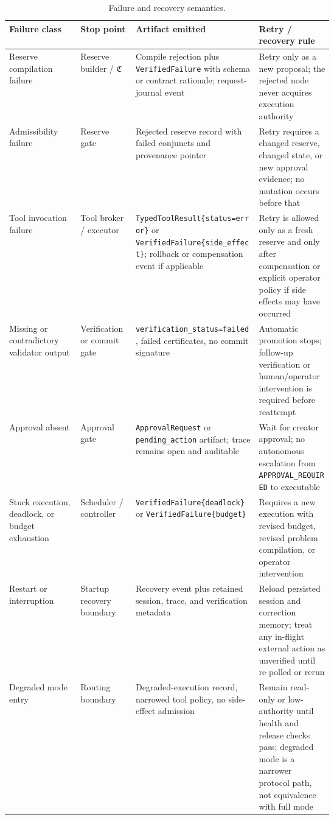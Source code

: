 \documentclass[11pt]{article}
\theoremstyle{remark}
\begin{document}
\begin{table}[H]
\centering
\caption{Failure and recovery semantics.}
\label{tab:failure-recovery}
\footnotesize
\begin{tabularx}{\linewidth}{@{}>{\raggedright\arraybackslash}p{0.22\linewidth}>{\raggedright\arraybackslash}p{0.17\linewidth}X>{\raggedright\arraybackslash}p{0.23\linewidth}@{}}
\toprule
\textbf{Failure class} & \textbf{Stop point} & \textbf{Artifact emitted} & \textbf{Retry / recovery rule} \\
\midrule
Reserve compilation failure & Reserve builder / \(\mathfrak{C}\) & Compile rejection plus \texttt{VerifiedFailure} with schema or contract rationale; request-journal event & Retry only as a new proposal; the rejected node never acquires execution authority \\
\addlinespace
Admissibility failure & Reserve gate & Rejected reserve record with failed conjuncts and provenance pointer & Retry requires a changed reserve, changed state, or new approval evidence; no mutation occurs before that \\
\addlinespace
Tool invocation failure & Tool broker / executor & \texttt{TypedToolResult\{status=error\}} or \texttt{VerifiedFailure\{side\_effect\}}; rollback or compensation event if applicable & Retry is allowed only as a fresh reserve and only after compensation or explicit operator policy if side effects may have occurred \\
\addlinespace
Missing or contradictory validator output & Verification or commit gate & \texttt{verification\_status=failed}, failed certificates, no commit signature & Automatic promotion stops; follow-up verification or human/operator intervention is required before reattempt \\
\addlinespace
Approval absent & Approval gate & \texttt{ApprovalRequest} or \texttt{pending\_action} artifact; trace remains open and auditable & Wait for creator approval; no autonomous escalation from \texttt{APPROVAL\_REQUIRED} to executable \\
\addlinespace
Stuck execution, deadlock, or budget exhaustion & Scheduler / controller & \texttt{VerifiedFailure\{deadlock\}} or \texttt{VerifiedFailure\{budget\}} & Requires a new execution with revised budget, revised problem compilation, or operator intervention \\
\addlinespace
Restart or interruption & Startup recovery boundary & Recovery event plus retained session, trace, and verification metadata & Reload persisted session and correction memory; treat any in-flight external action as unverified until re-polled or rerun \\
\addlinespace
Degraded mode entry & Routing boundary & Degraded-execution record, narrowed tool policy, no side-effect admission & Remain read-only or low-authority until health and release checks pass; degraded mode is a narrower protocol path, not equivalence with full mode \\
\bottomrule
\end{tabularx}
\end{table}
\end{document}
